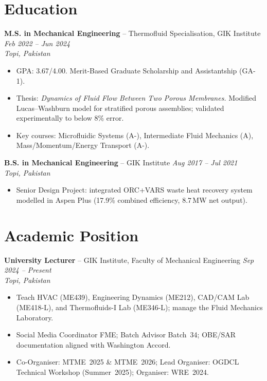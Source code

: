 \documentclass[11pt,a4paper]{article}
\begin{document}
\section{Education}

\textbf{M.S. in Mechanical Engineering} -- Thermofluid Specialisation, GIK
Institute \hfill \textit{Feb 2022 -- Jun 2024}\\
\textit{Topi, Pakistan}
\begin{itemize}
  \item GPA: 3.67/4.00. Merit-Based Graduate Scholarship and Assistantship (GA-1).
  \item Thesis: \textit{Dynamics of Fluid Flow Between Two Porous Membranes.}
        Modified Lucas--Washburn model for stratified porous assemblies; validated
        experimentally to below 8\% error.
  \item Key courses: Microfluidic Systems (A-), Intermediate Fluid Mechanics (A),
        Mass/Momentum/Energy Transport (A-).
\end{itemize}

\vspace{4pt}
\textbf{B.S. in Mechanical Engineering} -- GIK Institute
\hfill \textit{Aug 2017 -- Jul 2021}\\
\textit{Topi, Pakistan}
\begin{itemize}
  \item Senior Design Project: integrated ORC+VARS waste heat recovery system
        modelled in Aspen Plus (17.9\% combined efficiency, 8.7\,MW net output).
\end{itemize}

\section{Academic Position}

\textbf{University Lecturer} -- GIK Institute, Faculty of Mechanical Engineering
\hfill \textit{Sep 2024 -- Present}\\
\textit{Topi, Pakistan}
\begin{itemize}
  \item Teach HVAC (ME439), Engineering Dynamics (ME212), CAD/CAM Lab (ME418-L),
        and Thermofluids-I Lab (ME346-L); manage the Fluid Mechanics Laboratory.
  \item Social Media Coordinator FME; Batch Advisor Batch~34; OBE/SAR
        documentation aligned with Washington Accord.
  \item Co-Organiser: MTME~2025 \& MTME~2026; Lead Organiser: OGDCL Technical
        Workshop (Summer~2025); Organiser: WRE~2024.
\end{itemize}
\end{document}
